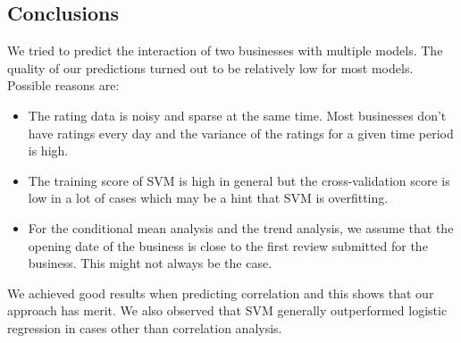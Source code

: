 \documentclass[a0,landscape,beamer]{a0poster}
\begin{document}
\begin{multicols}{4}
\color{SaddleBrown} %

\section*{Conclusions}
We tried to predict the interaction of two businesses with multiple models.
The quality of our predictions turned out to be relatively low for most models.
Possible reasons are:
\begin{itemize}
\item The rating data is noisy and sparse at the same time. Most businesses don't have ratings every day and the variance of the ratings for a given time period is high.
\item The training score of SVM is high in general but the cross-validation score is low in a lot of cases which may be a hint that SVM is overfitting.
\item For the conditional mean analysis and the trend analysis, we assume that the opening date of the business is close to the first review submitted for the business. This might not always be the case.
\end{itemize}

We achieved good results when predicting correlation and this shows that our approach has merit.
We also observed that SVM generally outperformed logistic regression in cases other than correlation analysis.

\color{DarkSlateGray} %




\nocite{*} %


\end{multicols}
\end{document}
